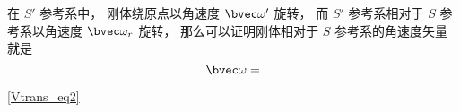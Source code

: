 

在 $S'$ 参考系中， 刚体绕原点以角速度 $\bvec \omega'$ 旋转， 而 $S'$ 参考系相对于 $S$ 参考系以角速度 $\bvec \omega_r$ 旋转， 那么可以证明刚体相对于 $S$ 参考系的角速度矢量就是
\begin{equation}
\bvec \omega = 
\end{equation}


\autoref{Vtrans_eq2}~
